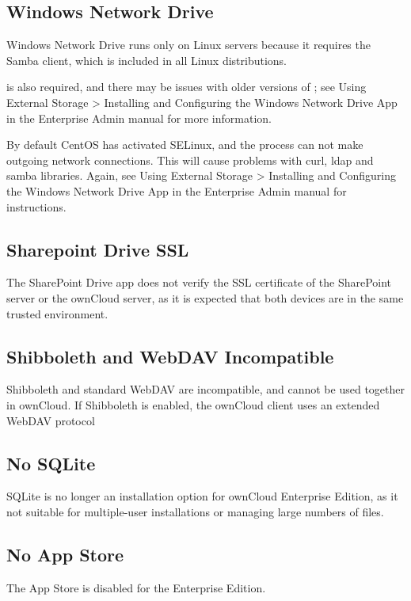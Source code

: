 \documentclass[letterpaper,10pt,english]{sphinxmanual}
\begin{document}
\subsection{Windows Network Drive}
\label{release_notes:windows-network-drive}
Windows Network Drive runs only on Linux servers because it requires the Samba
client, which is included in all Linux distributions.

 is also required, and there may be issues with older
versions of ; see Using External Storage \textgreater{} Installing and
Configuring the Windows Network Drive App in the Enterprise Admin manual for
more information.

By default CentOS has activated SELinux, and the  process can not make
outgoing network connections. This will cause problems with curl, ldap and samba
libraries. Again, see Using External Storage \textgreater{} Installing and Configuring the
Windows Network Drive App in the Enterprise Admin manual for instructions.


\subsection{Sharepoint Drive SSL}
\label{release_notes:sharepoint-drive-ssl}
The SharePoint Drive app does not verify the SSL certificate of the SharePoint
server or the ownCloud server, as it is expected that both devices are in the
same trusted environment.


\subsection{Shibboleth and WebDAV Incompatible}
\label{release_notes:shibboleth-and-webdav-incompatible}
Shibboleth and standard WebDAV are incompatible, and cannot be used together in
ownCloud. If Shibboleth is enabled, the ownCloud client uses an extended WebDAV
protocol


\subsection{No SQLite}
\label{release_notes:no-sqlite}
SQLite is no longer an installation option for ownCloud Enterprise Edition, as
it not suitable for multiple-user installations or managing large numbers of
files.


\subsection{No App Store}
\label{release_notes:no-app-store}
The App Store is disabled for the Enterprise Edition.
\end{document}
